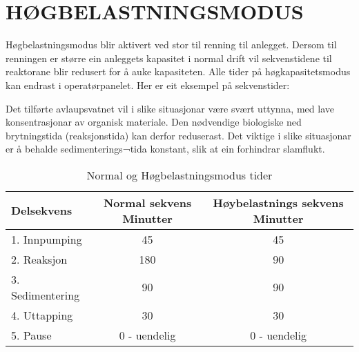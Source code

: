 \newpage
\section{HØGBELASTNINGSMODUS}

Høgbelastningsmodus blir aktivert ved stor til renning til anlegget. 
Dersom til renningen er større ein anleggets kapasitet i normal drift vil sekvenstidene til reaktorane blir redusert for å auke kapasiteten. 
Alle tider på høgkapasitetsmodus kan endrast i operatørpanelet.
Her er eit eksempel på sekvenstider:

Det tilførte avlaupsvatnet vil i slike situasjonar være svært uttynna, med lave konsentrasjonar av organisk materiale.
Den nødvendige biologiske ned brytningstida (reaksjonstida) kan derfor reduserast. 
Det viktige i slike situasjonar er å behalde sedimenterings¬tida konstant, slik at ein forhindrar slamflukt.

\begin{table}[h]
    \centering
    \begin{tabular}{|l|c|c|}
    \hline
        \rowcolor{myblack} %
        \textcolor{purewhite}{Delsekvens} & \textcolor{purewhite}{Normal sekvens Minutter} & \textcolor{purewhite}{Høybelastnings sekvens Minutter} \\ \hline
        \rowcolor{lightgray} 1. Innpumping & 45 & 45 \\ \hline
        \rowcolor{purewhite} 2. Reaksjon & 180 & 90 \\ \hline 
        \rowcolor{lightgray} 3. Sedimentering & 90 & 90 \\ \hline
        \rowcolor{purewhite} 4. Uttapping & 30 & 30 \\ \hline
        \rowcolor{lightgray} 5. Pause & 0 - uendelig & 0 - uendelig  \\ \hline
    \end{tabular}
    \caption{Normal og Høgbelastningsmodus tider}\label{table:Normal Og Høgbelastningsmodus}
\end{table}



